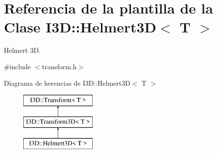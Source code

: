 \hypertarget{class_i3_d_1_1_helmert3_d}{}\section{Referencia de la plantilla de la Clase I3D\+:\+:Helmert3D$<$ T $>$}
\label{class_i3_d_1_1_helmert3_d}


Helmert 3D.  




{\ttfamily \#include $<$transform.\+h$>$}

Diagrama de herencias de I3D\+:\+:Helmert3D$<$ T $>$\begin{figure}[H]
\begin{center}
\leavevmode
\includegraphics[height=3.000000cm]{class_i3_d_1_1_helmert3_d}
\end{center}
\end{figure}

